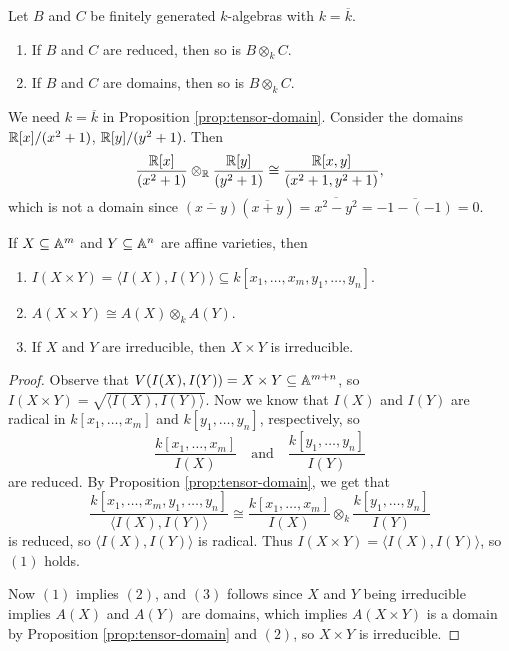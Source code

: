 \begin{prop}[Milne]\label{prop:tensor-domain}
  Let $B$ and $C$ be finitely generated
  $k$-algebras with $k = \overline{k}$.
  \begin{enumerate}
    \item If $B$ and $C$ are
      reduced, then so is $B \otimes_k C$.
    \item If $B$ and $C$ are domains,
      then so is $B \otimes_k C$.
  \end{enumerate}
\end{prop}

\begin{remark}
  We need $k = \overline{k}$ in
  Proposition \ref{prop:tensor-domain}.
  Consider the domains
  $\mathbb{R}[x] / (x^2 + 1)$,
  $\mathbb{R}[y] / (y^2 + 1)$. Then
  \[
    \frac{\mathbb{R}[x]}{(x^2 + 1)}
    \otimes_{\mathbb{R}}
    \frac{\mathbb{R}[y]}{(y^2 + 1)}
    \cong
    \frac{\mathbb{R}[x, y]}{(x^2 + 1, y^2 + 1)},
  \]
  which is not a domain since
  $(\overline{x - y})(\overline{x + y}) = \overline{x^2 - y^2} = \overline{-1 - (-1)} = 0$.
\end{remark}

\begin{corollary}
  If $X \subseteq \mathbb{A}^m$ and
  $Y \subseteq \mathbb{A}^n$ are affine
  varieties, then
  \begin{enumerate}
    \item $I(X \times Y) = \langle I(X), I(Y) \rangle \subseteq k[x_1, \dots, x_m, y_1, \dots, y_n]$.
    \item $A(X \times Y) \cong A(X) \otimes_k A(Y)$.
    \item If $X$ and $Y$ are irreducible,
      then $X \times Y$ is irreducible.
  \end{enumerate}
\end{corollary}

\begin{proof}
  Observe that
  $V(I(X), I(Y)) = X \times Y \subseteq \mathbb{A}^{m + n}$, so
  $I(X \times Y) = \sqrt{\langle I(X), I(Y) \rangle}$.
  Now we know that
  $I(X)$ and $I(Y)$ are radical in
  $k[x_1, \dots, x_m]$ and
  $k[y_1, \dots, y_n]$, respectively, so
  \[
    \frac{k[x_1, \dots, x_m]}{I(X)}
    \quad \text{and} \quad
    \frac{k[y_1, \dots, y_n]}{I(Y)}
  \]
  are reduced. By Proposition \ref{prop:tensor-domain},
  we get that
  \[
    \frac{k[x_1, \dots, x_m, y_1, \dots, y_n]}{\langle I(X), I(Y) \rangle}
    \cong
    \frac{k[x_1, \dots, x_m]}{I(X)}
    \otimes_k
    \frac{k[y_1, \dots, y_n]}{I(Y)}
  \]
  is reduced, so
  $\langle I(X), I(Y) \rangle$ is radical.
  Thus $I(X \times Y) = \langle I(X), I(Y) \rangle$, so
  $(1)$ holds.

  Now $(1)$ implies $(2)$, and
  $(3)$ follows since
  $X$ and $Y$ being irreducible implies
  $A(X)$ and $A(Y)$ are domains, which
  implies $A(X \times Y)$ is a domain
  by Proposition \ref{prop:tensor-domain}
  and $(2)$, so
  $X \times Y$ is irreducible.
\end{proof}

